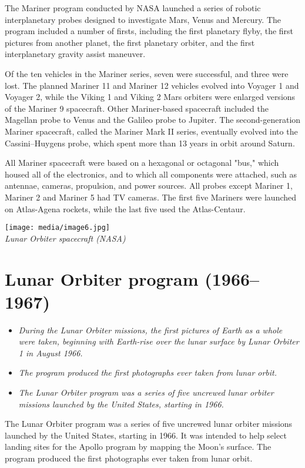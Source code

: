 The Mariner program conducted by NASA launched a series of robotic
interplanetary probes designed to investigate Mars, Venus and Mercury.
The program included a number of firsts, including the first planetary
flyby, the first pictures from another planet, the first planetary
orbiter, and the first interplanetary gravity assist maneuver.

Of the ten vehicles in the Mariner series, seven were successful, and
three were lost. The planned Mariner 11 and Mariner 12 vehicles evolved
into Voyager 1 and Voyager 2, while the Viking 1 and Viking 2 Mars
orbiters were enlarged versions of the Mariner 9 spacecraft. Other
Mariner-based spacecraft included the Magellan probe to Venus and the
Galileo probe to Jupiter. The second-generation Mariner spacecraft,
called the Mariner Mark II series, eventually evolved into the
Cassini--Huygens probe, which spent more than 13 years in orbit around
Saturn.

All Mariner spacecraft were based on a hexagonal or octagonal "bus,"
which housed all of the electronics, and to which all components were
attached, such as antennae, cameras, propulsion, and power sources. All
probes except Mariner 1, Mariner 2 and Mariner 5 had TV cameras. The
first five Mariners were launched on Atlas-Agena rockets, while the last
five used the Atlas-Centaur.

\texttt{[image: media/image6.jpg]}\\
\emph{Lunar Orbiter spacecraft (NASA)}

\section{Lunar Orbiter program
(1966--1967)}\label{lunar-orbiter-program-19661967}

\begin{itemize}
\item
  \emph{During the Lunar Orbiter missions, the first pictures of Earth
  as a whole were taken, beginning with Earth-rise over the lunar
  surface by Lunar Orbiter 1 in August 1966.}
\item
  \emph{The program produced the first photographs ever taken from lunar
  orbit.}
\item
  \emph{The Lunar Orbiter program was a series of five uncrewed lunar
  orbiter missions launched by the United States, starting in 1966.}
\end{itemize}

The Lunar Orbiter program was a series of five uncrewed lunar orbiter
missions launched by the United States, starting in 1966. It was
intended to help select landing sites for the Apollo program by mapping
the Moon's surface. The program produced the first photographs ever
taken from lunar orbit.

